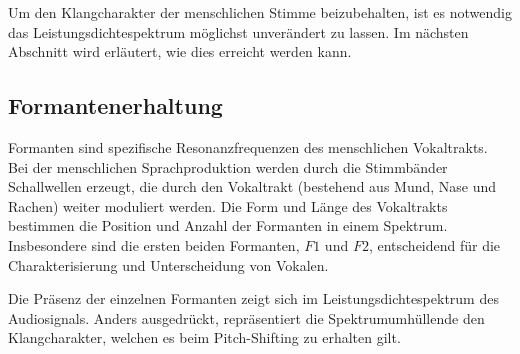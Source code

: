 Um den Klangcharakter der menschlichen Stimme beizubehalten,
ist es notwendig das Leistungsdichtespektrum möglichst unverändert zu lassen.
Im nächsten Abschnitt wird erläutert, wie dies erreicht werden kann.


\subsection{Formantenerhaltung
\label{autotune:subsection:formantenErhaltung}}
Formanten sind spezifische Resonanzfrequenzen des menschlichen Vokaltrakts.
Bei der menschlichen Sprachproduktion werden durch die Stimmbänder Schallwellen erzeugt,
die durch den Vokaltrakt (bestehend aus Mund, Nase und Rachen) weiter moduliert werden.
Die Form und Länge des Vokaltrakts bestimmen die Position und Anzahl der Formanten in einem Spektrum. 
Insbesondere sind die ersten beiden Formanten, $F1$ und $F2$,
entscheidend für die Charakterisierung und Unterscheidung von Vokalen.

Die Präsenz der einzelnen Formanten zeigt sich im Leistungsdichtespektrum des Audiosignals.
Anders ausgedrückt, repräsentiert die Spektrumumhüllende den Klangcharakter, welchen es beim Pitch-Shifting zu erhalten gilt.

